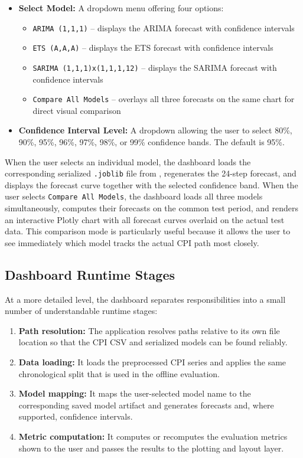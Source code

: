 \begin{itemize}
    \item \textbf{Select Model:} A dropdown menu offering four options:
    \begin{itemize}
        \item \texttt{ARIMA (1,1,1)} -- displays the ARIMA forecast with confidence intervals
        \item \texttt{ETS (A,A,A)} -- displays the ETS forecast with confidence intervals
        \item \texttt{SARIMA (1,1,1)x(1,1,1,12)} -- displays the SARIMA forecast with confidence intervals
        \item \texttt{Compare All Models} -- overlays all three forecasts on the same chart for direct visual comparison
    \end{itemize}
    \item \textbf{Confidence Interval Level:} A dropdown allowing the user to select 80\%, 90\%, 95\%, 96\%, 97\%, 98\%, or 99\% confidence bands. The default is 95\%.
\end{itemize}

When the user selects an individual model, the dashboard loads the corresponding serialized \texttt{.joblib} file from , regenerates the 24-step forecast, and displays the forecast curve together with the selected confidence band. When the user selects \texttt{Compare All Models}, the dashboard loads all three models simultaneously, computes their forecasts on the common test period, and renders an interactive Plotly chart with all forecast curves overlaid on the actual test data. This comparison mode is particularly useful because it allows the user to see immediately which model tracks the actual CPI path most closely.

\subsection{Dashboard Runtime Stages}

At a more detailed level, the dashboard separates responsibilities into a small number of understandable runtime stages:

\begin{enumerate}
    \item \textbf{Path resolution:} The application resolves paths relative to its own file location so that the CPI CSV and serialized models can be found reliably.
    \item \textbf{Data loading:} It loads the preprocessed CPI series and applies the same chronological split that is used in the offline evaluation.
    \item \textbf{Model mapping:} It maps the user-selected model name to the corresponding saved model artifact and generates forecasts and, where supported, confidence intervals.
    \item \textbf{Metric computation:} It computes or recomputes the evaluation metrics shown to the user and passes the results to the plotting and layout layer.
\end{enumerate}

